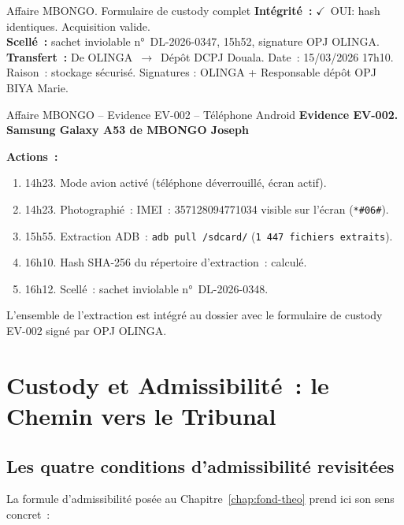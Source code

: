 \begin{boxscenario}{Affaire MBONGO. Formulaire de custody complet}
\textbf{Intégrité~:} $\checkmark$~OUI: hash identiques. Acquisition valide.\\

\textbf{Scellé~:} sachet inviolable n°~DL-2026-0347, 15h52, signature OPJ OLINGA.\\

\textbf{Transfert~:} De OLINGA~$\to$~Dépôt DCPJ Douala.
Date~: 15/03/2026 17h10. Raison~: stockage sécurisé. Signatures : OLINGA +
Responsable dépôt OPJ BIYA Marie.
\end{boxscenario}

\begin{boxscenario}{Affaire MBONGO -- Evidence EV-002 -- Téléphone Android}
\textbf{Evidence EV-002. Samsung Galaxy A53 de MBONGO Joseph}

\textbf{Actions~:}
\begin{enumerate}
    \item 14h23. Mode avion activé (téléphone déverrouillé, écran actif).
    \item 14h23. Photographié~: IMEI~: 357128094771034 visible sur l'écran
          (\texttt{*\#06\#}).
    \item 15h55. Extraction ADB~: \texttt{adb pull /sdcard/}
          (\texttt{1~447 fichiers extraits}).
    \item 16h10. Hash SHA-256 du répertoire d'extraction~: calculé.
    \item 16h12. Scellé~: sachet inviolable n°~DL-2026-0348.
\end{enumerate}

L'ensemble de l'extraction est intégré au dossier avec le formulaire de
custody EV-002 signé par OPJ OLINGA.
\end{boxscenario}

\section{Custody et Admissibilité~: le Chemin vers le Tribunal}
\label{sec:custody-admissibilite}

\subsection{Les quatre conditions d'admissibilité revisitées}

La formule d'admissibilité posée au Chapitre~\ref{chap:fond-theo} prend ici
son sens concret~:

